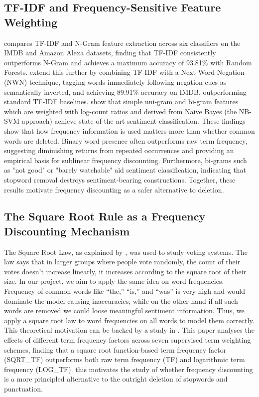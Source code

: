 \documentclass[a4paper,10pt]{article}
\begin{document}
\subsection{TF-IDF and Frequency-Sensitive Feature Weighting}
\cite{das2023comparative} compares TF-IDF and N-Gram feature extraction across six classifiers on the IMDB and Amazon Alexa datasets, finding that TF-IDF consistently outperforms N-Gram and achieves a maximum accuracy of 93.81\% with Random Forests. \cite{das2018tfidf} extend this further by combining TF-IDF with a Next Word Negation (NWN) technique, tagging words immediately following negation cues as semantically inverted, and achieving 89.91\% accuracy on IMDB, outperforming standard TF-IDF baselines. 
\citet{wang2012baselines} show that simple uni-gram and bi-gram features which are weighted with log-count ratios and derived from Naive Bayes (the NB-SVM approach) achieve state-of-the-art sentiment classification. These findings show that how frequency information is used matters more than whether common words are deleted. Binary word presence often outperforms raw term frequency, suggesting diminishing returns from repeated occurrences and providing an empirical basis for sublinear frequency discounting. Furthermore, bi-grams such as "not good" or "barely watchable" aid sentiment classification, indicating that stopword removal destroys sentiment-bearing constructions. Together, these results motivate frequency discounting as a safer alternative to deletion.
\subsection{The Square Root Rule as a Frequency Discounting Mechanism}
The Square Root Law, as explained by \cite{fielding1975voting}, was used to study voting systems. The law says that in larger groups where people vote randomly, the count of their votes doesn't increase linearly, it increases according to the square root of their size. In our project, we aim to apply the same idea on word frequencies. Frequency of common words like “the,” “is,” and “was” is very high and would dominate the model causing inaccuracies, while on the other hand if all such words are removed we could loose meaningful sentiment information. Thus, we apply a square root law to word frequencies on all words to model them correctly. This theoretical motivation can be backed by a study in \cite{dogan2019term}. This paper analyses the effects of different term frequency factors across seven supervised term weighting schemes, finding that a square root function-based term frequency factor (SQRT\_TF) outperforms both raw term frequency (TF) and logarithmic term frequency (LOG\_TF). this motivates the study of whether frequency discounting is a more principled alternative to the outright deletion of stopwords and punctuation.
\end{document}
